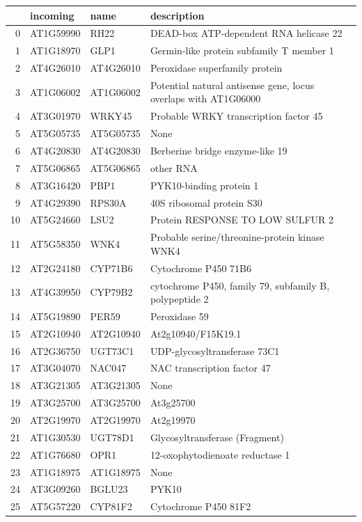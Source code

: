 \documentclass[11pt]{article}
\begin{document}
\begin{center}
\begin{tabular}{rlll}
 & incoming & name & description\\
\hline
0 & AT1G59990 & RH22 & DEAD-box ATP-dependent RNA helicase 22\\
1 & AT1G18970 & GLP1 & Germin-like protein subfamily T member 1\\
2 & AT4G26010 & AT4G26010 & Peroxidase superfamily protein\\
3 & AT1G06002 & AT1G06002 & Potential natural antisense gene, locus overlaps with AT1G06000\\
4 & AT3G01970 & WRKY45 & Probable WRKY transcription factor 45\\
5 & AT5G05735 & AT5G05735 & None\\
6 & AT4G20830 & AT4G20830 & Berberine bridge enzyme-like 19\\
7 & AT5G06865 & AT5G06865 & other RNA\\
8 & AT3G16420 & PBP1 & PYK10-binding protein 1\\
9 & AT4G29390 & RPS30A & 40S ribosomal protein S30\\
10 & AT5G24660 & LSU2 & Protein RESPONSE TO LOW SULFUR 2\\
11 & AT5G58350 & WNK4 & Probable serine/threonine-protein kinase WNK4\\
12 & AT2G24180 & CYP71B6 & Cytochrome P450 71B6\\
13 & AT4G39950 & CYP79B2 & cytochrome P450, family 79, subfamily B, polypeptide 2\\
14 & AT5G19890 & PER59 & Peroxidase 59\\
15 & AT2G10940 & AT2G10940 & At2g10940/F15K19.1\\
16 & AT2G36750 & UGT73C1 & UDP-glycosyltransferase 73C1\\
17 & AT3G04070 & NAC047 & NAC transcription factor 47\\
18 & AT3G21305 & AT3G21305 & None\\
19 & AT3G25700 & AT3G25700 & At3g25700\\
20 & AT2G19970 & AT2G19970 & At2g19970\\
21 & AT1G30530 & UGT78D1 & Glycosyltransferase (Fragment)\\
22 & AT1G76680 & OPR1 & 12-oxophytodienoate reductase 1\\
23 & AT1G18975 & AT1G18975 & None\\
24 & AT3G09260 & BGLU23 & PYK10\\
25 & AT5G57220 & CYP81F2 & Cytochrome P450 81F2\\

\end{tabular}
\end{center}
\end{document}
